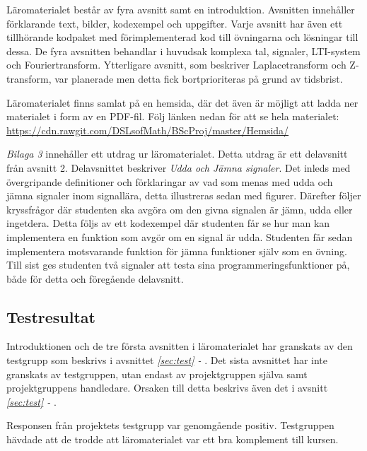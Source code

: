 \documentclass[12pt,a4paper,twoside,openright]{article}
\begin{document}
Läromaterialet består av fyra avsnitt samt en introduktion. Avsnitten
innehåller förklarande text, bilder, kodexempel och uppgifter. Varje
avsnitt har även ett tillhörande kodpaket med förimplementerad kod
till övningarna och lösningar till dessa. De fyra avsnitten behandlar
i huvudsak komplexa tal, signaler, LTI-system och Fouriertransform.
Ytterligare avsnitt, som beskriver Laplacetransform och
Z-transform, var planerade men detta fick bortprioriteras på grund av
tidsbrist.

Läromaterialet finns samlat på en hemsida, där det även är möjligt att
ladda ner materialet i form av en PDF-fil. Följ länken nedan för att
se hela materialet:
\url{https://cdn.rawgit.com/DSLsofMath/BScProj/master/Hemsida/}


\textit{Bilaga 3} innehåller ett utdrag ur läromaterialet. Detta
utdrag är ett delavsnitt från avsnitt 2. Delavsnittet beskriver
\textit{Udda och Jämna signaler}. Det inleds med övergripande
definitioner och förklaringar av vad som menas med udda och jämna
signaler inom signallära, detta illustreras sedan med
figurer. Därefter följer kryssfrågor där studenten ska avgöra om den
givna signalen är jämn, udda eller ingetdera. Detta följs av ett
kodexempel där studenten får se hur man kan implementera en funktion
som avgör om en signal är udda. Studenten får sedan implementera
motsvarande funktion för jämna funktioner själv som en övning. Till
sist ges studenten två signaler att testa sina
programmeringsfunktioner på, både för detta och föregående delavsnitt.


\subsection{Testresultat}
\label{sec:testResultat}
Introduktionen och de tre första avsnitten i läromaterialet har
granskats av den testgrupp som beskrivs i avsnittet \textit{\ref{sec:test} - }. Det sista avsnittet har inte granskats av
testgruppen, utan endast av projektgruppen själva samt projektgruppens
handledare. Orsaken till detta beskrivs även det i avsnitt \textit{\ref{sec:test}
  - }.

Responsen från projektets testgrupp var genomgående
positiv. Testgruppen hävdade att de trodde att läromaterialet var ett
bra komplement till kursen.
\end{document}
